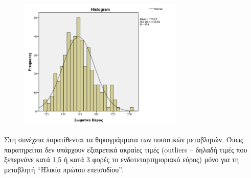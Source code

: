     \clearpage
    
    \vspace{0.5cm}
    
    \begin{figure}
        \centering
        \includegraphics[width=0.7\textwidth]{images/16.png}
    \end{figure}
    
    Στη συνέχεια παρατίθενται τα θηκογράμματα των ποσοτικών μεταβλητών. Όπως παρατηρείται δεν υπάρχουν εξαιρετικά ακραίες τιμές (outliers – δηλαδή τιμές που ξεπερνάνε κατά 1,5 ή κατά 3 φορές το ενδοτεταρτημοριακό εύρος) μόνο για τη μεταβλητή  “Ηλικία πρώτου επεισοδίου”. 
    
